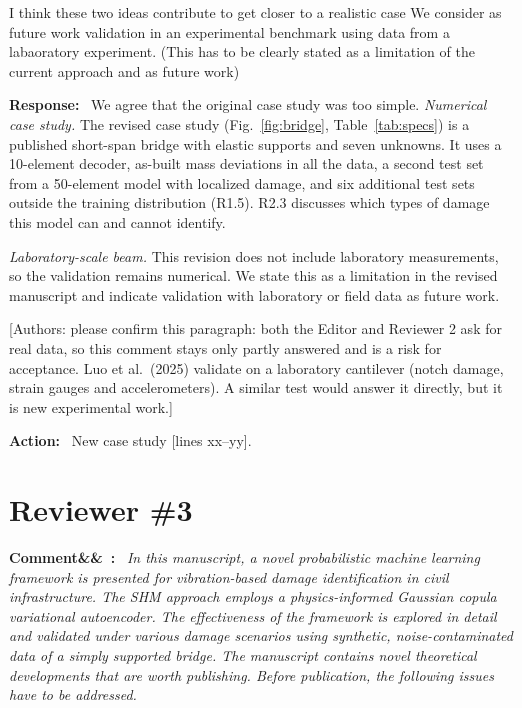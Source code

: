 \documentclass[11pt]{article}
\newenvironment{rcomment}[1]{\par\bigskip\noindent\textbf{Comment\ifx&#1&\else\ #1\fi:}\ \itshape}{\par}
\newenvironment{response}{\par\smallskip\noindent\color{resp}\textbf{Response:}\ }{\par}
\newenvironment{action}{\par\smallskip\noindent\color{resp}\textbf{Action:}\ }{\par}
\newcommand{\authornote}[1]{\textcolor{note}{\textsf{[Authors: #1]}}}
\newcommand{\tbd}[1]{\textcolor{note}{\textsf{[#1]}}}
\newcommand{\lines}[1]{\tbd{lines #1}}
\begin{document}
I think these two ideas contribute to get closer to a realistic case
We consider as future work validation in an experimental benchmark using data from a labaoratory experiment. (This has to be clearly stated as a limitation of the current approach and as future work)


\begin{response}
We agree that the original case study was too simple. \textit{Numerical case study.} The revised case study (Fig.~\ref{fig:bridge}, Table~\ref{tab:specs}) is a published short-span bridge with
elastic supports and seven unknowns. It uses a 10-element decoder, as-built mass deviations in all the data, a second test set from
a 50-element model with localized damage, and six additional test sets outside the training distribution (R1.5). R2.3 discusses which types of damage this model
can and cannot identify.

\textit{Laboratory-scale beam.} This revision does not include laboratory measurements, so the validation remains numerical.
We state this as a limitation in the revised manuscript and indicate validation with laboratory or field data as future
work.
\end{response}
\authornote{please confirm this paragraph: both the Editor and Reviewer 2 ask for real data, so this comment stays only partly
answered and is a risk for acceptance. Luo et al.\ (2025) validate on a laboratory cantilever (notch damage, strain gauges and
accelerometers). A similar test would answer it directly, but it is new experimental work.}

\begin{action}
New case study \lines{xx--yy}.
\end{action}

\section{Reviewer \#3}

\begin{rcomment}{}
In this manuscript, a novel probabilistic machine learning framework is presented for vibration-based damage
identification in civil infrastructure. The SHM approach employs a physics-informed Gaussian copula variational
autoencoder. The effectiveness of the framework is explored in detail and validated under various damage scenarios
using synthetic, noise-contaminated data of a simply supported bridge. The manuscript contains novel theoretical
developments that are worth publishing. Before publication, the following issues have to be addressed.
\end{rcomment}
\end{document}
